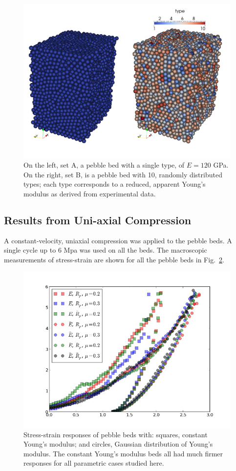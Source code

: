 \begin{figure}[t]
  \centering
  \includegraphics[width = 0.75 \textwidth]{chapters/figures/DEM-types}
  \caption{On the left, set A, a pebble bed with a single type, of $E = 120$ GPa. On the right, set B, is a pebble bed with 10, randomly distributed types; each type corresponds to a reduced, apparent Young's modulus as derived from experimental data.}\label{fig:dem-types}
\end{figure}





\subsection{Results from Uni-axial Compression}


A constant-velocity, uniaxial compression was applied to the pebble beds. A single cycle up to 6 Mpa was used on all the beds. The macroscopic measurements of stress-strain are shown for all the pebble beds in Fig.~\ref{fig:stress-strain}.

\begin{figure}[t]
  \centering
  \includegraphics[width = 0.75 \textwidth]{chapters/figures/stress-strain}
  \caption{Stress-strain responses of pebble beds with: squares, constant Young's modulus; and circles, Gaussian distribution of Young's modulus. The constant Young's modulus beds all had much firmer responses for all parametric cases studied here.}\label{fig:stress-strain}
\end{figure}

